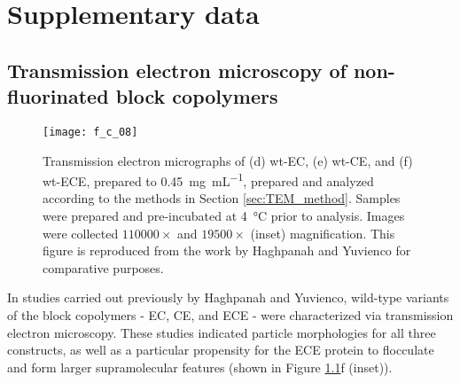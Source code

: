 \chapter{Supplementary data}
\begin{refsection}

\section{Transmission electron microscopy of non-fluorinated block copolymers}
\begin{figure}[h!] \centering \texttt{[image: f\_c\_08]}
    \caption[]{Transmission electron micrographs of (d) wt-EC, (e) wt-CE, and
        (f) wt-ECE, prepared to \SI{0.45}{\mg\per\mL}, prepared and analyzed
        according to the methods in Section \ref{sec:TEM_method}. Samples were
        prepared and pre-incubated at \SI{4}{\celsius} prior to analysis. Images
        were collected ${110000 \times}$ and ${19500 \times}$ (inset)
        magnification. This figure is reproduced from the work by Haghpanah and
        Yuvienco for comparative purposes.\cite{Haghpanah2010}}
        \label{fig:block_EM_wt} \end{figure}
In studies carried out previously by Haghpanah and Yuvienco, wild-type variants
of the block copolymers - EC, CE, and ECE - were characterized via transmission
electron microscopy. These studies indicated particle morphologies for all three
constructs, as well as a particular propensity for the ECE protein to flocculate
and form larger supramolecular features (shown in Figure \ref{fig:block_EM_wt}f
(inset)).


\end{refsection}
